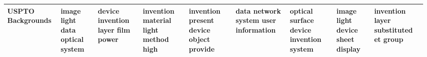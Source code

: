 \documentclass[11pt,a4paper]{article}
\begin{document}
\begin{appendices}
\begin{table}[htb]
\begin{tiny}
\begin{tabular}{|p{}|p{}|p{}|p{}|p{}|p{}|p{}|p{}|p{}|}
    USPTO Backgrounds & image \newline light \newline data \newline optical \newline system & device \newline invention \newline layer \newline film \newline power & invention \newline material \newline light \newline method \newline high & invention \newline present \newline device \newline object \newline provide & data \newline network \newline system \newline user \newline information & optical \newline surface \newline device \newline invention \newline system & image \newline light \newline device \newline sheet \newline display & invention \newline layer \newline substituted \newline et \newline group\\\hline

\end{tabular}
\end{tiny}
\end{table}
\end{appendices}
\end{document}
